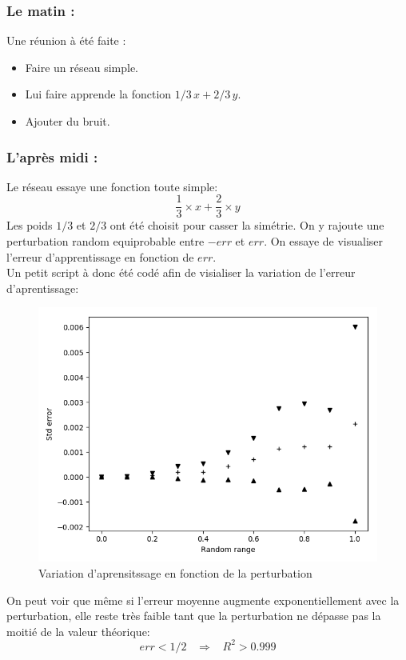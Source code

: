 \usepackage{comment}

\subsubsection*{Le matin :}
Une réunion à été faite :
\begin{itemize}
    \item Faire un réseau simple.
    \item Lui faire apprende la fonction $1/3\, x + 2/3\, y$.
    \item Ajouter du bruit.
\end{itemize}

\subsubsection*{L'après midi :}
Le réseau essaye une fonction toute simple:
\begin{equation}
    \frac{1}{3} \times x + \frac{2}{3} \times y
\end{equation}
Les poids $1/3$ et $2/3$ ont été choisit pour casser la simétrie.
On y rajoute une perturbation random equiprobable entre $-err$ et $err$.
On essaye de visualiser l'erreur d'apprentissage en fonction de $err$. \\
Un petit script à donc été codé afin de visialiser la variation de l'erreur d'aprentissage:

\begin{figure}[H]
    \center
    \includegraphics[height=\moyen]{sources/data/Obj2/tiers/graph1.png}
	\caption{Variation d'aprensitssage en fonction de la perturbation}
	\label{obj2tiers1}
\end{figure}

On peut voir que même si l'erreur moyenne augmente exponentiellement avec la perturbation,
elle reste très faible tant que la perturbation ne dépasse pas la moitié de la valeur théorique:
\begin{equation}
    err < 1/2 \; \; \; \Rightarrow \; \; \; R^2 > 0.999
\end{equation}
